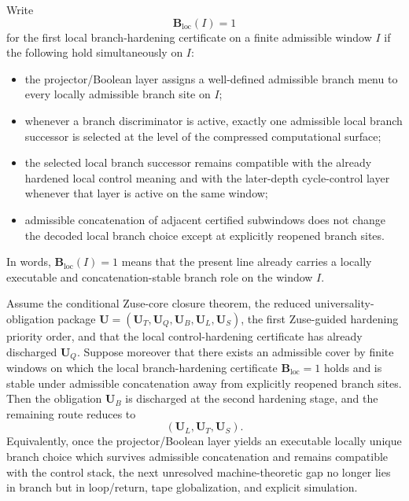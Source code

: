 \begin{definition}
Write
\[
\mathbf B_{\mathrm{loc}}(I)=1
\]
for the first local branch-hardening certificate on a finite admissible window $I$ if the following hold simultaneously on $I$:
\begin{itemize}[leftmargin=2em]
 \item the projector/Boolean layer assigns a well-defined admissible branch menu to every locally admissible branch site on $I$;
 \item whenever a branch discriminator is active, exactly one admissible local branch successor is selected at the level of the compressed computational surface;
 \item the selected local branch successor remains compatible with the already hardened local control meaning and with the later-depth cycle-control layer whenever that layer is active on the same window;
 \item admissible concatenation of adjacent certified subwindows does not change the decoded local branch choice except at explicitly reopened branch sites.
\end{itemize}
In words, $\mathbf B_{\mathrm{loc}}(I)=1$ means that the present line already carries a locally executable and concatenation-stable branch role on the window $I$.
\end{definition}

\begin{proposition}
Assume the conditional Zuse-core closure theorem, the reduced universality-obligation package \(\mathbf U=(\mathbf U_T,\mathbf U_Q,\mathbf U_B,\mathbf U_L,\mathbf U_S)\), the first Zuse-guided hardening priority order, and that the local control-hardening certificate has already discharged \(\mathbf U_Q\). Suppose moreover that there exists an admissible cover by finite windows on which the local branch-hardening certificate \(\mathbf B_{\mathrm{loc}}=1\) holds and is stable under admissible concatenation away from explicitly reopened branch sites. Then the obligation \(\mathbf U_B\) is discharged at the second hardening stage, and the remaining route reduces to
\[
(\mathbf U_L,\mathbf U_T,\mathbf U_S).
\]
Equivalently, once the projector/Boolean layer yields an executable locally unique branch choice which survives admissible concatenation and remains compatible with the control stack, the next unresolved machine-theoretic gap no longer lies in branch but in loop/return, tape globalization, and explicit simulation.
\end{proposition}


